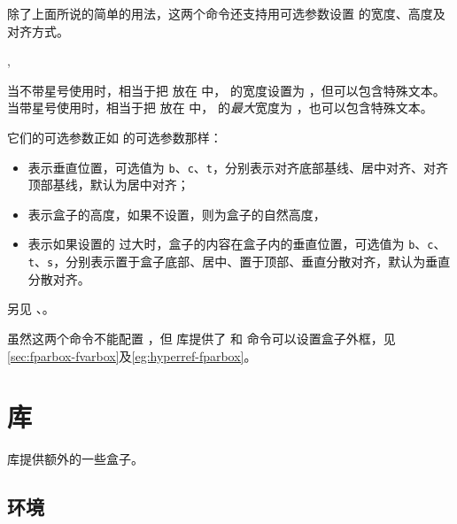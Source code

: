 \documentclass{cusdoc}
\begin{document}
除了上面所说的简单的用法，这两个命令还支持用可选参数设置  的宽度、高度及对齐方式。
\begin{function}[label={HyperRef2,HyperLink2}]{\HyperRef,\HyperLink}
  \begin{syntax}
    \V\HyperRef   {}  
    \V\HyperRef *   
    \V\HyperRef   {}     
    \V\HyperRef *      
  \end{syntax}

当不带星号使用时，相当于把  放在  中， 的宽度设置为 ，但可以包含特殊文本。
当带星号使用时，相当于把  放在  中， 的\emph{最大}宽度为 ，也可以包含特殊文本。

它们的可选参数正如  的可选参数那样：
\begin{itemize}
\item {} 表示垂直位置，可选值为 \texttt{b}、\texttt{c}、\texttt{t}，分别表示对齐底部基线、居中对齐、对齐顶部基线，默认为居中对齐；
\item {} 表示盒子的高度，如果不设置，则为盒子的自然高度，
\item {} 表示如果设置的  过大时，盒子的内容在盒子内的垂直位置，可选值为 \texttt{b}、\texttt{c}、\texttt{t}、\texttt{s}，分别表示置于盒子底部、居中、置于顶部、垂直分散对齐，默认为垂直分散对齐。
\end{itemize}

另见 、。
\end{function}

虽然这两个命令不能配置 ，但  库提供了  和  命令可以设置盒子外框，见\cref{sec:fparbox-fvarbox}及\cref{eg:hyperref-fparbox}。


\section{库}\label{sec:lib-box}

 库提供额外的一些盒子。

\subsection{环境}
\end{document}
